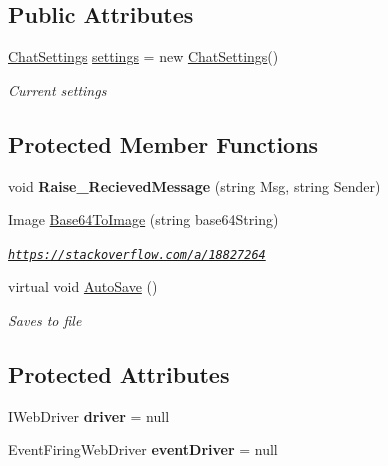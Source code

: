 \subsection*{Public Attributes}
\begin{DoxyCompactItemize}
\item 
\hyperlink{class_web_whatsapp_a_p_i_1_1_base_class_1_1_chat_settings}{Chat\+Settings} \hyperlink{class_web_whatsapp_a_p_i_1_1_base_class_af7b5c73d834b7c97f6aa1947310af34e}{settings} = new \hyperlink{class_web_whatsapp_a_p_i_1_1_base_class_1_1_chat_settings}{Chat\+Settings}()
\begin{DoxyCompactList}\small\item\em Current settings \end{DoxyCompactList}\end{DoxyCompactItemize}
\subsection*{Protected Member Functions}
\begin{DoxyCompactItemize}
\item 
\mbox{\label{class_web_whatsapp_a_p_i_1_1_base_class_a797576c847b00eee08dd92693bd522c4}} 
void {\bfseries Raise\+\_\+\+Recieved\+Message} (string Msg, string Sender)
\item 
Image \hyperlink{class_web_whatsapp_a_p_i_1_1_base_class_a3c18dac86c5b0a57ebfb1822e89518d8}{Base64\+To\+Image} (string base64\+String)
\begin{DoxyCompactList}\small\item\em \href{https://stackoverflow.com/a/18827264}{\tt https\+://stackoverflow.\+com/a/18827264} \end{DoxyCompactList}\item 
virtual void \hyperlink{class_web_whatsapp_a_p_i_1_1_base_class_a56a2f1cfc0bef6cad2aae521e9c4d20a}{Auto\+Save} ()
\begin{DoxyCompactList}\small\item\em Saves to file \end{DoxyCompactList}\end{DoxyCompactItemize}
\subsection*{Protected Attributes}
\begin{DoxyCompactItemize}
\item 
\mbox{\label{class_web_whatsapp_a_p_i_1_1_base_class_a2887b40fd1edaad98a26848369f83864}} 
I\+Web\+Driver {\bfseries driver} = null
\item 
\mbox{\label{class_web_whatsapp_a_p_i_1_1_base_class_a10068a3275629827584bda048227c456}} 
Event\+Firing\+Web\+Driver {\bfseries event\+Driver} = null
\end{DoxyCompactItemize}
